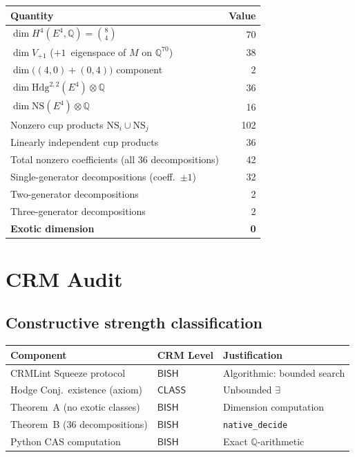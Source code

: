\documentclass[11pt]{article}
\theoremstyle{plain}
\theoremstyle{definition}
\theoremstyle{remark}
\newcommand{\Q}{\mathbb{Q}}
\newcommand{\NS}{\mathrm{NS}}
\newcommand{\Hdg}{\mathrm{Hdg}}
\newcommand{\BISH}{\mathsf{BISH}}
\newcommand{\CLASS}{\mathsf{CLASS}}
\begin{document}
\begin{center}
\begin{tabular}{lr}
\toprule
\textbf{Quantity} & \textbf{Value} \\
\midrule
$\dim H^4(E^4, \Q) = \binom{8}{4}$ & 70 \\
$\dim V_{+1}$ ($+1$~eigenspace of $M$ on $\Q^{70}$) & 38 \\
$\dim \bigl((4,0)+(0,4)\bigr)$ component & 2 \\
$\dim \Hdg^{2,2}(E^4) \otimes \Q$ & 36 \\
$\dim \NS(E^4) \otimes \Q$ & 16 \\
Nonzero cup products $\NS_i \cup \NS_j$ & 102 \\
Linearly independent cup products & 36 \\
Total nonzero coefficients (all 36 decompositions) & 42 \\
Single-generator decompositions (coeff.\ $\pm 1$) & 32 \\
Two-generator decompositions & 2 \\
Three-generator decompositions & 2 \\
\textbf{Exotic dimension} & \textbf{0} \\
\bottomrule
\end{tabular}
\end{center}

\section{CRM Audit}\label{sec:crm}

\subsection{Constructive strength classification}

\begin{center}
\begin{tabular}{lll}
\toprule
\textbf{Component} & \textbf{CRM Level} & \textbf{Justification} \\
\midrule
CRMLint Squeeze protocol & $\BISH$ & Algorithmic: bounded search \\
Hodge Conj.\ existence (axiom) & $\CLASS$ & Unbounded $\exists$ \\
Theorem~A (no exotic classes) & $\BISH$ & Dimension computation \\
Theorem~B (36 decompositions) & $\BISH$ & \texttt{native\_decide} \\
Python CAS computation & $\BISH$ & Exact $\Q$-arithmetic \\
\bottomrule
\end{tabular}
\end{center}
\end{document}
